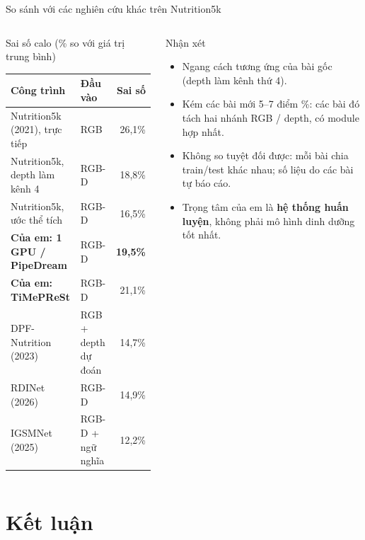 \documentclass[10pt,aspectratio=169]{beamer}
\newcommand{\kw}[1]{\textcolor{uitblue}{\bfseries #1}}
\begin{document}
\begin{frame}{So sánh với các nghiên cứu khác trên Nutrition5k}
\begin{columns}[T]
\begin{uitbox}{\faBook\; Sai số calo (\% so với giá trị trung bình)}
\scriptsize
\setlength{\tabcolsep}{4pt}
\begin{tabular}{@{}L{3.6cm}L{1.6cm}r@{}}
\toprule
\textbf{Công trình} & \textbf{Đầu vào} & \textbf{Sai số} \\
\midrule
Nutrition5k (2021), trực tiếp & RGB & 26,1\% \\
Nutrition5k, depth làm kênh 4 & RGB-D & 18,8\% \\
Nutrition5k, ước thể tích & RGB-D & 16,5\% \\
\textbf{Của em: 1 GPU / PipeDream} & RGB-D & \textbf{19,5\%} \\
\textbf{Của em: TiMePReSt} & RGB-D & 21,1\% \\
DPF-Nutrition (2023) & RGB + depth dự đoán & 14,7\% \\
RDINet (2026) & RGB-D & 14,9\% \\
IGSMNet (2025) & RGB-D + ngữ nghĩa & 12,2\% \\
\bottomrule
\end{tabular}
\end{uitbox}
\begin{accentbox}{\faInfoCircle\; Nhận xét}
\scriptsize
\begin{itemize}
  \item Ngang cách tương ứng của bài gốc (depth làm kênh thứ 4).
  \item Kém các bài mới 5--7 điểm \%: các bài đó tách hai nhánh RGB / depth, có module hợp nhất.
  \item Không so tuyệt đối được: mỗi bài chia train/test khác nhau; số liệu do các bài tự báo cáo.
  \item Trọng tâm của em là \kw{hệ thống huấn luyện}, không phải mô hình dinh dưỡng tốt nhất.
\end{itemize}
\end{accentbox}
\end{columns}
\end{frame}

\section{Kết luận}
\end{document}
